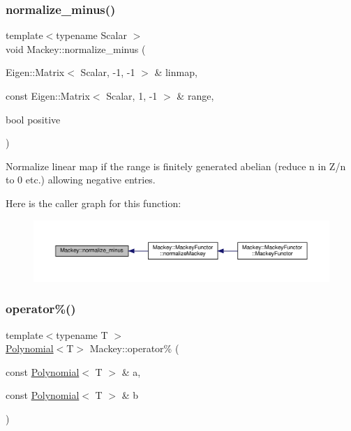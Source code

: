 \subsubsection{\texorpdfstring{normalize\+\_\+minus()}{normalize\_minus()}}
{\footnotesize\ttfamily template$<$typename Scalar $>$ \\
void Mackey\+::normalize\+\_\+minus (\begin{DoxyParamCaption}\item[{Eigen\+::\+Matrix$<$ Scalar, -\/1, -\/1 $>$ \&}]{linmap,  }\item[{const Eigen\+::\+Matrix$<$ Scalar, 1, -\/1 $>$ \&}]{range,  }\item[{bool}]{positive }\end{DoxyParamCaption})}



Normalize linear map if the range is finitely generated abelian (reduce n in Z/n to 0 etc.) allowing negative entries. 

Here is the caller graph for this function\+:\nopagebreak
\begin{figure}[H]
\begin{center}
\leavevmode
\includegraphics[width=350pt]{namespaceMackey_a463bb762b4edc2f283e8d1c0c466aedf_icgraph}
\end{center}
\end{figure}
\mbox{\label{namespaceMackey_adb145e729d40138080b5a58d26a89388}} 
\subsubsection{\texorpdfstring{operator\%()}{operator\%()}}
{\footnotesize\ttfamily template$<$typename T $>$ \\
\hyperlink{classMackey_1_1Polynomial}{Polynomial}$<$T$>$ Mackey\+::operator\% (\begin{DoxyParamCaption}\item[{const \hyperlink{classMackey_1_1Polynomial}{Polynomial}$<$ T $>$ \&}]{a,  }\item[{const \hyperlink{classMackey_1_1Polynomial}{Polynomial}$<$ T $>$ \&}]{b }\end{DoxyParamCaption})}

